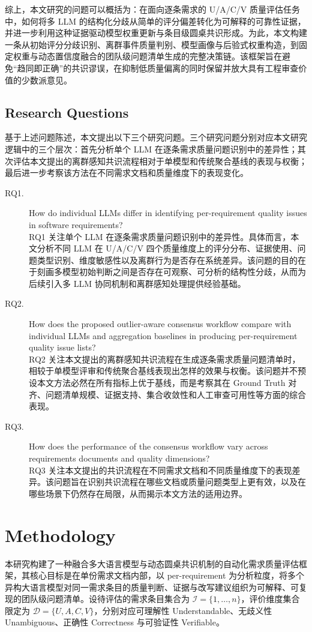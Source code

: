 \documentclass[a4paper,11pt]{ctexart}
\begin{document}
综上，本文研究的问题可以概括为：在面向逐条需求的 U/A/C/V 质量评估任务中，如何将多 LLM 的结构化分歧从简单的评分偏差转化为可解释的可靠性证据，并进一步利用这种证据驱动模型权重更新与条目级圆桌共识形成。为此，本文构建一条从初始评分分歧识别、离群事件质量判别、模型画像与后验式权重构造，到固定权重与动态置信度融合的团队级问题清单生成的完整决策链。该框架旨在避免“趋同即正确”的共识谬误，在抑制低质量偏离的同时保留并放大具有工程审查价值的少数派意见。

\subsection{Research Questions}
基于上述问题陈述，本文提出以下三个研究问题。三个研究问题分别对应本文研究逻辑中的三个层次：首先分析单个 LLM 在逐条需求质量问题识别中的差异性；其次评估本文提出的离群感知共识流程相对于单模型和传统聚合基线的表现与权衡；最后进一步考察该方法在不同需求文档和质量维度下的表现变化。

\begin{description}
\item[RQ1.] How do individual LLMs differ in identifying per-requirement quality issues in software requirements? \\
RQ1 关注单个 LLM 在逐条需求质量问题识别中的差异性。具体而言，本文分析不同 LLM 在 U/A/C/V 四个质量维度上的评分分布、证据使用、问题类型识别、维度敏感性以及离群行为是否存在系统差异。该问题的目的在于刻画多模型初始判断之间是否存在可观察、可分析的结构性分歧，从而为后续引入多 LLM 协同机制和离群感知处理提供经验基础。
\item[RQ2.] How does the proposed outlier-aware consensus workflow compare with individual LLMs and aggregation baselines in producing per-requirement quality issue lists? \\
RQ2 关注本文提出的离群感知共识流程在生成逐条需求质量问题清单时，相较于单模型评审和传统聚合基线表现出怎样的效果与权衡。该问题并不预设本文方法必然在所有指标上优于基线，而是考察其在 Ground Truth 对齐、问题清单规模、证据支持、集合收敛性和人工审查可用性等方面的综合表现。
\item[RQ3.] How does the performance of the consensus workflow vary across requirements documents and quality dimensions? \\
RQ3 关注本文提出的共识流程在不同需求文档和不同质量维度下的表现差异。该问题旨在识别共识流程在哪些文档或质量问题类型上更有效，以及在哪些场景下仍然存在局限，从而揭示本文方法的适用边界。
\end{description}

\section{Methodology}
\label{sec:method}
本研究构建了一种融合多大语言模型与动态圆桌共识机制的自动化需求质量评估框架，其核心目标是在单份需求文档内部，以 per-requirement 为分析粒度，将多个异构大语言模型对同一需求条目的质量判断、证据与改写建议组织为可解释、可复现的团队级问题清单。设待评估的需求条目集合为 $\mathcal{I}=\{1,\dots,n\}$，评价维度集合限定为 $\mathcal{D}=\{U,A,C,V\}$，分别对应可理解性 Understandable、无歧义性 Unambiguous、正确性 Correctness 与可验证性 Verifiable。
\end{document}
